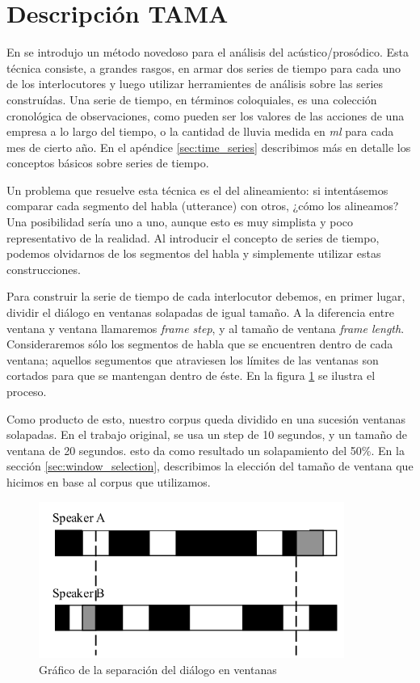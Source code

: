 \section{Descripción TAMA}
\label{sec:ant_tama}

En \cite{KOU2008} se introdujo un método novedoso para el análisis del \entrainment acústico/prosódico. Esta técnica consiste, a grandes rasgos, en armar dos series de tiempo para cada uno de los interlocutores y luego utilizar herramientes de análisis sobre las series construídas. Una serie de tiempo, en términos coloquiales, es una colección cronológica de observaciones, como pueden ser los valores de las acciones de una empresa a lo largo del tiempo, o la cantidad de lluvia medida en \emph{ml} para cada mes de cierto año. En el apéndice \ref{sec:time_series} describimos más en detalle los conceptos básicos sobre series de tiempo.

Un problema que resuelve esta técnica es el del alineamiento: si intentásemos comparar cada segmento del habla (utterance) con otros, ¿cómo los alineamos? Una posibilidad sería uno a uno, aunque esto es muy simplista y poco representativo de la realidad. Al introducir el concepto de series de tiempo, podemos olvidarnos de los segmentos del habla y simplemente utilizar estas construcciones.

Para construir la serie de tiempo de cada interlocutor debemos, en primer lugar, dividir el diálogo en ventanas solapadas de igual tamaño. A la diferencia entre ventana y ventana llamaremos \emph{frame step}, y al tamaño de ventana \emph{frame length}. Consideraremos sólo los segmentos de habla que se encuentren dentro de cada ventana; aquellos segumentos que atraviesen los límites de las ventanas son cortados para que se mantengan dentro de éste. En la figura \ref{tama} se ilustra el proceso.

Como producto de esto, nuestro corpus queda dividido en una sucesión ventanas solapadas. En el trabajo original, se usa un step de 10 segundos, y un tamaño de ventana de 20 segundos. esto da como resultado un solapamiento del 50\%. En la sección \ref{sec:window_selection}, describimos la elección del tamaño de ventana que hicimos en base al corpus que utilizamos.

\begin{figure}
\centering
\includegraphics[width=10cm]{images/tama.png}
\caption{Gráfico de la separación del diálogo en ventanas}
\label{tama}
\end{figure}

